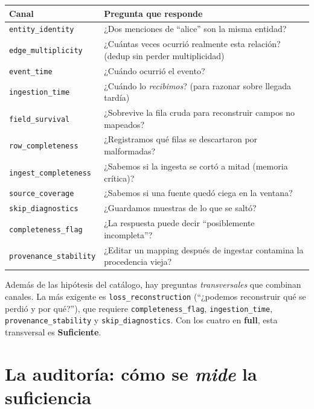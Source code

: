 \documentclass[11pt,a4paper]{article}
\newcommand{\term}[1]{\textcolor{ghblue}{\textbf{#1}}}
\newcommand{\code}[1]{\texttt{\small #1}}
\begin{document}
\begin{center}
\renewcommand{\arraystretch}{1.25}
\begin{tabular}{@{}p{3.6cm}p{10.8cm}@{}}
\toprule
\textbf{Canal} & \textbf{Pregunta que responde} \\
\midrule
\code{entity\_identity} & ¿Dos menciones de ``alice'' son la misma entidad? \\
\code{edge\_multiplicity} & ¿Cuántas veces ocurrió realmente esta relación? (dedup sin perder multiplicidad) \\
\code{event\_time} & ¿Cuándo ocurrió el evento? \\
\code{ingestion\_time} & ¿Cuándo lo \emph{recibimos}? (para razonar sobre llegada tardía) \\
\code{field\_survival} & ¿Sobrevive la fila cruda para reconstruir campos no mapeados? \\
\code{row\_completeness} & ¿Registramos qué filas se descartaron por malformadas? \\
\code{ingest\_completeness} & ¿Sabemos si la ingesta se cortó a mitad (memoria crítica)? \\
\code{source\_coverage} & ¿Sabemos si una fuente quedó ciega en la ventana? \\
\code{skip\_diagnostics} & ¿Guardamos muestras de lo que se saltó? \\
\code{completeness\_flag} & ¿La respuesta puede decir ``posiblemente incompleta''? \\
\code{provenance\_stability} & ¿Editar un mapping después de ingestar contamina la procedencia vieja? \\
\bottomrule
\end{tabular}
\end{center}

\begin{ideabox}
Además de las hipótesis del catálogo, hay preguntas \emph{transversales} que
combinan canales. La más exigente es \code{loss\_reconstruction}
(``¿podemos reconstruir qué se perdió y por qué?''), que requiere
\code{completeness\_flag}, \code{ingestion\_time}, \code{provenance\_stability}
y \code{skip\_diagnostics}. Con los cuatro en \textbf{full}, esta transversal
es \term{Suficiente}.
\end{ideabox}

\section{La auditoría: cómo se \emph{mide} la suficiencia}
\end{document}
